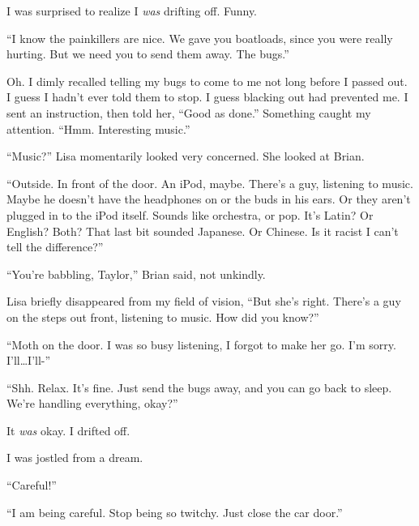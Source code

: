 I was surprised to realize I \emph{was} drifting off.  Funny.



``I know the painkillers are nice.  We gave you boatloads, since you were really hurting.  But we need you to send them away.  The bugs.''



Oh.  I dimly recalled telling my bugs to come to me not long before I passed out.  I guess I hadn't ever told them to stop.  I guess blacking out had prevented me.  I sent an instruction, then told her, ``Good as done.''  Something caught my attention. ``Hmm.  Interesting music.''



``Music?''  Lisa momentarily looked very concerned.  She looked at Brian.



``Outside.  In front of the door.  An iPod, maybe.  There's a guy, listening to music.  Maybe he doesn't have the headphones on or the buds in his ears.  Or they aren't plugged in to the iPod itself.  Sounds like orchestra, or pop.  It's Latin?  Or English?  Both?  That last bit sounded Japanese.  Or Chinese.  Is it racist I can't tell the difference?''



``You're babbling, Taylor,'' Brian said, not unkindly.



Lisa briefly disappeared from my field of vision, ``But she's right.  There's a guy on the steps out front, listening to music.  How did you know?''



``Moth on the door.  I was so busy listening, I forgot to make her go.  I'm sorry.  I'll\ldots I'll-''



``Shh.  Relax.  It's fine.  Just send the bugs away, and you can go back to sleep.  We're handling everything, okay?''



It \emph{was} okay.  I drifted off.



\blacksquare



I was jostled from a dream.



``Careful!''



``I am being careful.  Stop being so twitchy.  Just close the car door.''



